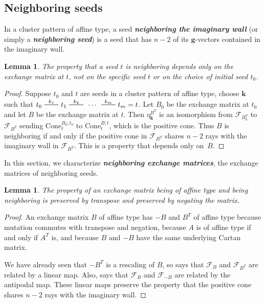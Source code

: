 \documentclass{amsart}
\newtheorem{lemma}[proposition]{Lemma}
\theoremstyle{definition}
\theoremstyle{remark}
\numberwithin{equation}{section}
\newcommand{\newword}[1]{\textbf{\emph{#1}}}
\newcommand{\edge}{\,\,\rule[2.7pt]{20pt}{0.5pt}\,\,}
\newcommand{\F}{{\mathcal F}}
\newcommand{\0}{{\mathbf{0}}}
\newcommand{\Cone}{\mathrm{Cone}}
\newcommand{\g}{\mathbf{g}}
\newcommand{\kk}{{\boldsymbol{k}}}
\begin{document}
\subsection{Neighboring seeds}
In a cluster pattern of affine type, a seed \newword{neighboring the imaginary wall} (or simply a \newword{neighboring seed}) is a seed that has $n-2$ of its $\g$-vectors contained in the imaginary wall.

\begin{lemma}\label{neigh B only}
The property that a seed $t$ is neighboring depends only on the exchange matrix at $t$, not on the specific seed $t$ or on the choice of initial seed $t_0$.
\end{lemma}
\begin{proof}
Suppose $t_0$ and $t$ are seeds in a cluster pattern of affine type, choose $\kk$ such that $t_0\overset{k_1}{\edge}t_1\overset{k_2}{\edge}\,\cdots\,\overset{k_m}{\edge}t_m=t$.
Let $B_0$ be the exchange matrix at $t_0$ and let $B$ be the exchange matrix at $t$.
Then $\eta^{B^T}_\kk$ is an isomorphism from $\F_{B_0^T}$ to $\F_{B^T}$ sending $\Cone_t^{B_0;t_0}$ to $\Cone_t^{B;t}$, which is the positive cone.
Thus $B$ is neighboring if and only if the positive cone in $\F_{B^T}$ shares $n-2$ rays with the imaginary wall in $\F_{B^T}$.
This is a property that depends only on~$B$.
\end{proof}

In this section, we characterize \newword{neighboring exchange matrices}, the exchange matrices of neighboring seeds.

\begin{lemma}\label{neigh neg and T}
The property of an exchange matrix being of affine type and being neighboring is preserved by transpose and preserved by negating the matrix.
\end{lemma}
\begin{proof}
An exchange matrix $B$ of affine type has $-B$ and $B^T$ of affine type because mutation commutes with transpose and negation, because $A$ is of affine type if and only if $A^T$ is, and because $B$ and $-B$ have the same underlying Cartan matrix.

We have already seen that $-B^T$ is a rescaling of $B$, so \cite[Proposition~7.8(3)]{universal} says that $\F_B$ and $\F_{B^T}$ are related by a linear map.
Also, \cite[Proposition~7.1]{universal} says that $\F_B$ and $\F_{-B}$ are related by the antipodal map.
These linear maps preserve the property that the positive cone shares $n-2$ rays with the imaginary wall.
\end{proof}
\end{document}
